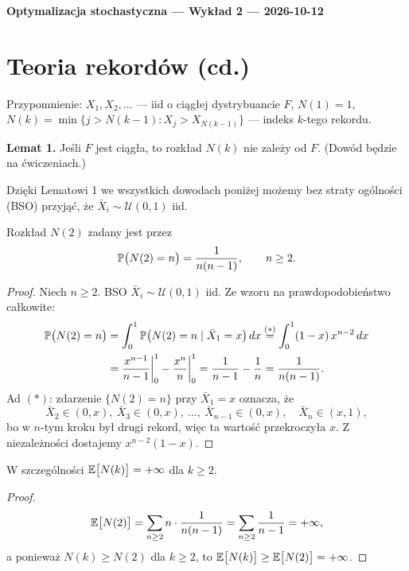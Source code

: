 \documentclass[dvipsnames]{book}
\begin{document}
\begin{center}
  {\Large\bfseries Optymalizacja stochastyczna --- Wykład 2 --- 2026-10-12}
\end{center}

\section*{Teoria rekordów (cd.)}

Przypomnienie: $X_1, X_2, \ldots$ --- iid o ciągłej dystrybuancie $F$,
$N(1) = 1$, $N(k) = \min\big\{j > N(k-1) : X_j > X_{N(k-1)}\big\}$ --- indeks
$k$-tego rekordu.

\textbf{Lemat 1.} Jeśli $F$ jest ciągła, to rozkład $N(k)$ nie zależy od $F$.
(Dowód będzie na ćwiczeniach.)

Dzięki Lematowi 1 we wszystkich dowodach poniżej możemy bez straty ogólności
(BSO) przyjąć, że $\bar X_i \sim \mathcal{U}(0,1)$ iid.

\setcounter{thmcnt}{1}

\begin{twierdzenie}
Rozkład $N(2)$ zadany jest przez
\[
  \P\big(N(2) = n\big) = \frac{1}{n(n-1)}, \qquad n \geq 2.
\]
\end{twierdzenie}

\begin{proof}
Niech $n \geq 2$. BSO $\bar X_i \sim \mathcal{U}(0,1)$ iid. Ze wzoru na
prawdopodobieństwo całkowite:
\begin{align*}
  \P\big(N(2) = n\big)
  &= \int_0^1 \P\big(N(2) = n \mid \bar X_1 = x\big)\, dx
  \overset{(*)}{=} \int_0^1 (1-x)\, x^{n-2}\, dx \\
  &= \frac{x^{n-1}}{n-1}\bigg|_0^1 - \frac{x^n}{n}\bigg|_0^1
  = \frac{1}{n-1} - \frac{1}{n} = \frac{1}{n(n-1)}.
\end{align*}
Ad $(*)$: zdarzenie $\{N(2) = n\}$ przy $\bar X_1 = x$ oznacza, że
\[
  \bar X_2 \in (0,x),\ \bar X_3 \in (0,x),\ \ldots,\ \bar X_{n-1} \in (0,x),
  \quad \bar X_n \in (x,1),
\]
bo w $n$-tym kroku był drugi rekord, więc ta wartość przekroczyła $x$.
Z niezależności dostajemy $x^{n-2}(1-x)$.
\end{proof}

\begin{wniosek}
W szczególności $\E\big[N(k)\big] = +\infty$ dla $k \geq 2$.
\end{wniosek}
\begin{proof}
\[
  \E\big[N(2)\big] = \sum_{n \geq 2} n \cdot \frac{1}{n(n-1)}
  = \sum_{n \geq 2} \frac{1}{n-1} = +\infty,
\]
a ponieważ $N(k) \geq N(2)$ dla $k \geq 2$, to
$\E\big[N(k)\big] \geq \E\big[N(2)\big] = +\infty$.
\end{proof}
\end{document}
